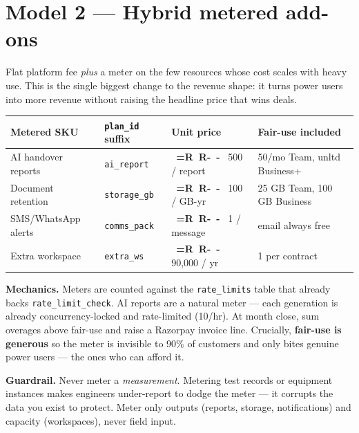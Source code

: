 \documentclass[11pt,a4paper]{article}
\newcommand{\Rs}{%
  \mbox{%
    \sffamily\bfseries
    \setbox0=\hbox{R}%
    R\kern-\wd0
    \raisebox{0.42em}{\rule{0.55em}{0.07em}}%
    \kern-\wd0
    \raisebox{0.25em}{\rule{0.55em}{0.07em}}%
    \kern\wd0
  }%
}
\newcommand{\plan}[1]{\texttt{\textcolor{accent}{#1}}}
\begin{document}
\section{Model 2 --- Hybrid metered add-ons}

Flat platform fee \emph{plus} a meter on the few resources whose cost scales with
heavy use. This is the single biggest change to the revenue shape: it turns
power users into more revenue without raising the headline price that wins deals.

\begin{center}
\begin{tabular}{@{}L{4.0cm} L{3.2cm} R{2.6cm} L{4.6cm}@{}}
  \toprule
  \textbf{Metered SKU} & \textbf{\texttt{plan\_id} suffix} & \textbf{Unit price} & \textbf{Fair-use included} \\
  \midrule
  AI handover reports   & \plan{ai\_report}    & \Rs 500 / report  & 50/mo Team, unltd Business+ \\
  Document retention    & \plan{storage\_gb}   & \Rs 100 / GB-yr   & 25 GB Team, 100 GB Business \\
  SMS/WhatsApp alerts   & \plan{comms\_pack}   & \Rs 1 / message   & email always free \\
  Extra workspace       & \plan{extra\_ws}     & \Rs 90{,}000 / yr  & 1 per contract \\
  \bottomrule
\end{tabular}
\end{center}

\textbf{Mechanics.} Meters are counted against the \texttt{rate\_limits} table
that already backs \texttt{rate\_limit\_check}. AI reports are a natural meter ---
each generation is already concurrency-locked and rate-limited (10/hr). At
month close, sum overages above fair-use and raise a Razorpay invoice line.
Crucially, \textbf{fair-use is generous} so the meter is invisible to 90\% of
customers and only bites genuine power users --- the ones who can afford it.

\begin{keybox}
\textbf{Guardrail.} Never meter a \emph{measurement}. Metering test records or
equipment instances makes engineers under-report to dodge the meter --- it
corrupts the data you exist to protect. Meter only outputs (reports, storage,
notifications) and capacity (workspaces), never field input.
\end{keybox}

\end{document}
